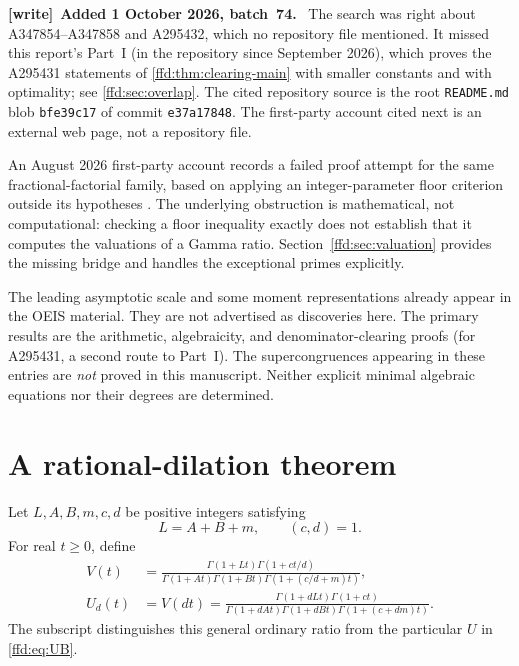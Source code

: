 \documentclass[11pt]{article}
\theoremstyle{definition}
\theoremstyle{remark}
\newenvironment{writenote}[1][]{\par\smallskip\begingroup\small
 \noindent\textbf{[write]}\if\relax\detokenize{#1}\relax\else~\textbf{#1.}\fi\ }%
 {\par\endgroup\smallskip}
\begin{document}
\begin{writenote}[Added 1 October 2026, batch~74]
The search was right about A347854--A347858 and A295432, which no repository
file mentioned. It missed this report's Part~I (in the repository since
September 2026), which proves the A295431 statements of
\cref{ffd:thm:clearing-main} with smaller constants and with optimality; see
\cref{ffd:sec:overlap}. The cited repository source \cite{ffd-proveit} is the
root \texttt{README.md} blob \texttt{bfe39c17} of commit \texttt{e37a17848}.
The first-party account \cite{ffd-failed} cited next is an external web page,
not a repository file.
\end{writenote}

An August 2026 first-party account records a failed proof attempt for the same
fractional-factorial family, based on applying an integer-parameter floor
criterion outside its hypotheses \cite{ffd-failed}. The underlying obstruction is
mathematical, not computational: checking a floor inequality exactly does not
establish that it computes the valuations of a Gamma ratio. Section~\ref{ffd:sec:valuation}
provides the missing bridge and handles the exceptional primes explicitly.

The leading asymptotic scale and some moment representations already appear
in the OEIS material. They are not advertised as discoveries here. The primary
results are the arithmetic, algebraicity, and denominator-clearing proofs
(for A295431, a second route to Part~I).
The supercongruences appearing in these entries are \emph{not} proved in this
manuscript. Neither explicit minimal algebraic equations nor their degrees
are determined.

\section{A rational-dilation theorem}\label{ffd:sec:dilation}
Let $L,A,B,m,c,d$ be positive integers satisfying
\begin{equation}
 L=A+B+m,\qquad (c,d)=1.
 \label{ffd:eq:params}
\end{equation}
For real $t\ge0$, define
\begin{align}
 V(t)&=\frac{\Gamma(1+Lt)\Gamma(1+ct/d)}
 {\Gamma(1+At)\Gamma(1+Bt)\Gamma(1+(c/d+m)t)},\label{ffd:eq:V}\\
 U_d(t)&=V(dt)
 =\frac{\Gamma(1+dLt)\Gamma(1+ct)}
 {\Gamma(1+dAt)\Gamma(1+dBt)\Gamma(1+(c+dm)t)}.
 \label{ffd:eq:Ud}
\end{align}
The subscript distinguishes this general ordinary ratio from the particular
$U$ in \eqref{ffd:eq:UB}.
\end{document}
